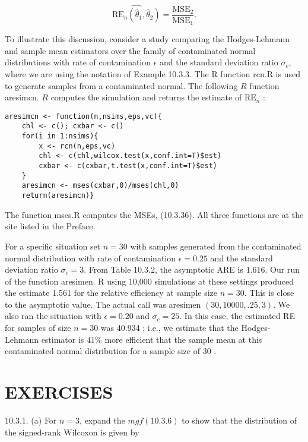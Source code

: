 \begin{equation*}
\widehat{\mathrm{RE}_{n}\left(\widehat{\theta}_{1}, \widehat{\theta}_{2}\right)}=\frac{\mathrm{MSE}_{2}}{\mathrm{MSE}_{1}} . \tag{10.3.37}
\end{equation*}


To illustrate this discussion, consider a study comparing the Hodges-Lehmann and sample mean estimators over the family of contaminated normal distributions with rate of contamination $\epsilon$ and the standard deviation ratio $\sigma_{c}$, where we are using the notation of Example 10.3.3. The R function $\mathrm{rcn} . \mathrm{R}$ is used to generate samples from a contaminated normal. The following $R$ function aresimcn. $R$ computes the simulation and returns the estimate of $\mathrm{RE}_{n}$ :

\begin{verbatim}
aresimcn <- function(n,nsims,eps,vc){
    chl <- c(); cxbar <- c()
    for(i in 1:nsims){
        x <- rcn(n,eps,vc)
        chl <- c(chl,wilcox.test(x,conf.int=T)$est)
        cxbar <- c(cxbar,t.test(x,conf.int=T)$est)
    }
    aresimcn <- mses(cxbar,0)/mses(chl,0)
    return(aresimcn)}
\end{verbatim}

The function mses.R computes the MSEs, (10.3.36). All three functions are at the site listed in the Preface.

For a specific situation set $n=30$ with samples generated from the contaminated normal distribution with rate of contamination $\epsilon=0.25$ and the standard deviation ratio $\sigma_{c}=3$. From Table 10.3.2, the asymptotic ARE is 1.616. Our run of the function aresimen. R using 10,000 simulations at these settings produced the estimate 1.561 for the relative efficiency at sample size $n=30$. This is close to the asymptotic value. The actual call was aresimen $(30,10000, .25,3)$. We also ran the situation with $\epsilon=0.20$ and $\sigma_{c}=25$. In this case, the estimated RE for samples of size $n=30$ was 40.934 ; i.e., we estimate that the Hodges-Lehmann estimator is $41 \%$ more efficient that the sample mean at this contaminated normal distribution for a sample size of 30 .

\section*{EXERCISES}
10.3.1. (a) For $n=3$, expand the $m g f(10.3 .6)$ to show that the distribution of the signed-rank Wilcoxon is given by

